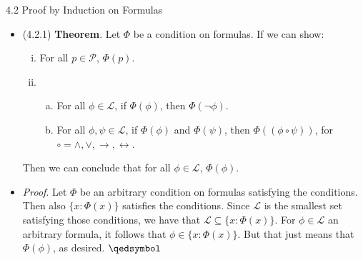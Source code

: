 \begin{frame}{4.2 Proof by Induction on Formulas}

	\begin{itemize}
	
		\item (4.2.1) \textbf{Theorem}. Let $\Phi$ be a condition on formulas. If we can show:
		\begin{enumerate}[(i)]
		
			\item For all $p\in\mathcal{P}$, $\Phi(p)$.
			
			\item \begin{enumerate}[(a)]
			
			\item For all $\phi\in\mathcal{L}$, if $\Phi(\phi)$, then $\Phi(\neg\phi)$.

			\item For all $\phi,\psi\in\mathcal{L}$, if $\Phi(\phi)$ and $\Phi(\psi)$, then $\Phi((\phi\circ\psi))$, for $\circ=\land,\lor,\to,\leftrightarrow$.
		
		\end{enumerate}
		\end{enumerate}
		Then we can conclude that for all $\phi\in\mathcal{L}$, $\Phi(\phi)$.
		
		\item \emph{Proof}. Let $\Phi$ be an arbitrary condition on formulas satisfying the conditions. Then also $\{x:\Phi(x)\}$ satisfies the conditions. Since $\mathcal{L}$ is the smallest set satisfying those conditions, we have that $\mathcal{L}\subseteq\{x:\Phi(x)\}$. For $\phi\in\mathcal{L}$ an arbitrary formula, it follows that $\phi\in\{x:\Phi(x)\}$. But that just means that $\Phi(\phi)$, as desired. $\qedsymbol$

	\end{itemize}


\end{frame}
		
